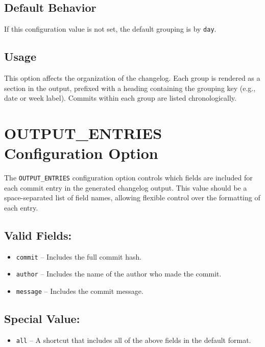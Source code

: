 \subsection*{Default Behavior}
If this configuration value is not set, the default grouping is by \texttt{day}.

\subsection*{Usage}
This option affects the organization of the changelog. Each group is rendered as a section in the output, prefixed with a heading containing the grouping key (e.g., date or week label). Commits within each group are listed chronologically.









\section{OUTPUT\_ENTRIES Configuration Option}

The \texttt{OUTPUT\_ENTRIES} configuration option controls which fields are included for each commit entry in the generated changelog output. This value should be a space-separated list of field names, allowing flexible control over the formatting of each entry.

\subsection*{Valid Fields:}
\begin{itemize}
	\item \texttt{commit} -- Includes the full commit hash.
	\item \texttt{author} -- Includes the name of the author who made the commit.
	\item \texttt{message} -- Includes the commit message.
\end{itemize}

\subsection*{Special Value:}
\begin{itemize}
	\item \texttt{all} -- A shortcut that includes all of the above fields in the default format.
\end{itemize}

